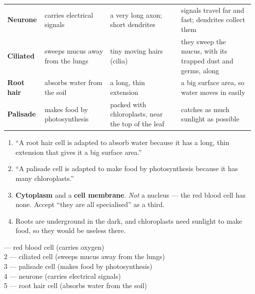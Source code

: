 \documentclass[12pt,a4paper]{article}
\begin{document}
\smallskip
{}

\noindent
\begin{tabularx}{\linewidth}{@{}p{2.4cm}p{3.4cm}p{3.6cm}X@{}}
  \textbf{Neurone} & carries electrical signals & a very long axon; short dendrites &
  signals travel far and fast; dendrites collect them \\
  \textbf{Ciliated} & sweeps mucus away from the lungs & tiny moving hairs (cilia) &
  they sweep the mucus, with its trapped dust and germs, along \\
  \textbf{Root hair} & absorbs water from the soil & a long, thin extension &
  a big surface area, so water moves in easily \\
  \textbf{Palisade} & makes food by photosynthesis & packed with chloroplasts, near
  the top of the leaf & catches as much sunlight as possible \\
\end{tabularx}

\begin{enumerate}[label=\arabic*., itemsep=2pt]
  \item ``A root hair cell is adapted to absorb water because it has a long, thin
        extension that gives it a big surface area.''
  \item ``A palisade cell is adapted to make food by photosynthesis because it has
        many chloroplasts.''
  \item \textbf{Cytoplasm} and a \textbf{cell membrane}. \emph{Not} a nucleus --- the
        red blood cell has none. Accept ``they are all specialised'' as a third.
  \item Roots are underground in the dark, and chloroplasts need sunlight to make
        food, so they would be useless there.
\end{enumerate}

 --- red blood cell (carries oxygen) \\
2 --- ciliated cell (sweeps mucus away from the lungs) \\
3 --- palisade cell (makes food by photosynthesis) \\
4 --- neurone (carries electrical signals) \\
5 --- root hair cell (absorbs water from the soil)
\end{document}

